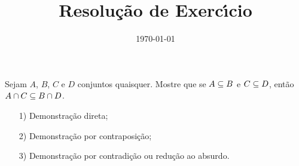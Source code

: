 \documentclass{beamer}
\title{Resolu\c{c}\~ao de Exerc{\'\i}cio}
\author[\autor]{\autor}
\institute[\instituto]{\instituto}
\date{\today}
\begin{document}
    \begin{frame}
        \maketitle
    \end{frame}


    \begin{frame}
        \begin{exercicio}
            Sejam $A$, $B$, $C$ e $D$ conjuntos quaisquer. Mostre que se $A \subseteq B$ e $C \subseteq D$, ent\~ao $A \cap C \subseteq B \cap D$.\pause
        \end{exercicio}
        \vspace{1cm}
        \begin{itemize}
            \item[1)] Demonstra\c{c}\~ao direta;\pause \vspace{1cm}
            \item[2)] Demonstra\c{c}\~ao por contraposi\c{c}\~ao;\pause \vspace{1cm}
            \item[3)] Demonstra\c{c}\~ao por contradi\c{c}\~ao ou redu\c{c}\~ao ao absurdo.\pause \vspace{1cm}
        \end{itemize}
    \end{frame}

    \begin{frame}
        \begin{solucao}
            \vspace{7cm}
        \end{solucao}
    \end{frame}
    \begin{frame}
        \begin{solucao}
            \vspace{7cm}
        \end{solucao}
    \end{frame}
    \begin{frame}
        \begin{solucao}
            \vspace{7cm}
        \end{solucao}
    \end{frame}
\end{document}
